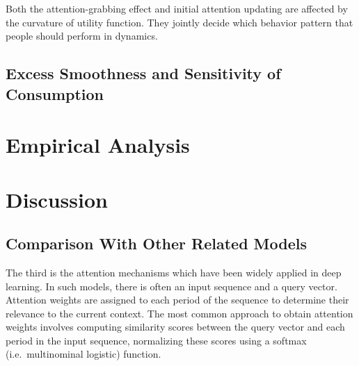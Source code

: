 \documentclass[
  12pt,
]{article}
\begin{document}
Both the attention-grabbing effect and initial attention updating are
affected by the curvature of utility function. They jointly decide which
behavior pattern that people should perform in dynamics.

\hypertarget{excess-smoothness-and-sensitivity-of-consumption}{%
\subsection{Excess Smoothness and Sensitivity of
Consumption}\label{excess-smoothness-and-sensitivity-of-consumption}}

\hypertarget{empirical-analysis}{%
\section{Empirical Analysis}\label{empirical-analysis}}

\hypertarget{discussion}{%
\section{Discussion}\label{discussion}}

\hypertarget{comparison-with-other-related-models}{%
\subsection{Comparison With Other Related
Models}\label{comparison-with-other-related-models}}

The third is the attention mechanisms which have been widely applied in
deep learning. In such models, there is often an input sequence and a
query vector. Attention weights are assigned to each period of the
sequence to determine their relevance to the current context. The most
common approach to obtain attention weights involves computing
similarity scores between the query vector and each period in the input
sequence, normalizing these scores using a softmax (i.e.~multinominal
logistic) function.
\end{document}
